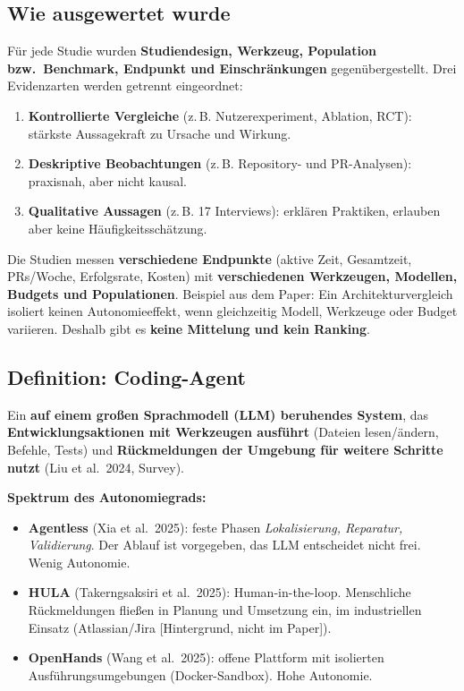 \documentclass[12pt,a4paper]{article}
\newcommand{\hg}{\textcolor{grau}{\small[Hintergrund, nicht im Paper]}}
\newcommand{\quelle}[1]{\textcolor{grau}{(#1)}}
\begin{document}
\subsection{Wie ausgewertet wurde}
Für jede Studie wurden \textbf{Studiendesign, Werkzeug, Population bzw.\ Benchmark, Endpunkt und Einschränkungen} gegenübergestellt. Drei Evidenzarten werden getrennt eingeordnet:
\begin{enumerate}
  \item \textbf{Kontrollierte Vergleiche} (z.\,B. Nutzerexperiment, Ablation, RCT): stärkste Aussagekraft zu Ursache und Wirkung.
  \item \textbf{Deskriptive Beobachtungen} (z.\,B. Repository- und PR-Analysen): praxisnah, aber nicht kausal.
  \item \textbf{Qualitative Aussagen} (z.\,B. 17 Interviews): erklären Praktiken, erlauben aber keine Häufigkeitsschätzung.
\end{enumerate}

\begin{merke}
Die Studien messen \textbf{verschiedene Endpunkte} (aktive Zeit, Gesamtzeit, PRs/Woche, Erfolgsrate, Kosten) mit \textbf{verschiedenen Werkzeugen, Modellen, Budgets und Populationen}. Beispiel aus dem Paper: Ein Architekturvergleich isoliert keinen Autonomieeffekt, wenn gleichzeitig Modell, Werkzeuge oder Budget variieren. Deshalb gibt es \textbf{keine Mittelung und kein Ranking}.
\end{merke}

\subsection{Definition: Coding-Agent}
Ein \textbf{auf einem großen Sprachmodell (LLM) beruhendes System}, das \textbf{Entwicklungsaktionen mit Werkzeugen ausführt} (Dateien lesen/ändern, Befehle, Tests) und \textbf{Rückmeldungen der Umgebung für weitere Schritte nutzt} \quelle{Liu et al.\ 2024, Survey}.

\textbf{Spektrum des Autonomiegrads:}
\begin{itemize}
  \item \textbf{Agentless} \quelle{Xia et al.\ 2025}: feste Phasen \emph{Lokalisierung, Reparatur, Validierung}. Der Ablauf ist vorgegeben, das LLM entscheidet nicht frei. Wenig Autonomie.
  \item \textbf{HULA} \quelle{Takerngsaksiri et al.\ 2025}: Human-in-the-loop. Menschliche Rückmeldungen fließen in Planung und Umsetzung ein, im industriellen Einsatz (Atlassian/Jira \hg).
  \item \textbf{OpenHands} \quelle{Wang et al.\ 2025}: offene Plattform mit isolierten Ausführungsumgebungen (Docker-Sandbox). Hohe Autonomie.
\end{itemize}
\end{document}
